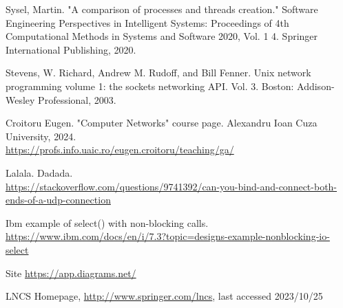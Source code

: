 \documentclass[runningheads]{llncs}
\begin{document}
\begin{thebibliography}{8}
Sysel, Martin. "A comparison of processes and threads creation." Software Engineering Perspectives in Intelligent Systems: Proceedings of 4th Computational Methods in Systems and Software 2020, Vol. 1 4. Springer International Publishing, 2020. 

 Stevens, W. Richard, Andrew M. Rudoff, and Bill Fenner. Unix network programming volume 1: the sockets networking API. Vol. 3. Boston: Addison-Wesley Professional, 2003.

  Croitoru Eugen. "Computer Networks" course page. Alexandru Ioan Cuza University, 2024. \\
  \url{https://profs.info.uaic.ro/eugen.croitoru/teaching/ga/}

    Lalala. Dadada. \\
    \url{https://stackoverflow.com/questions/9741392/can-you-bind-and-connect-both-ends-of-a-udp-connection}

 Ibm example of select() with non-blocking calls. \url{https://www.ibm.com/docs/en/i/7.3?topic=designs-example-nonblocking-io-select}

 Site \url{https://app.diagrams.net/}

LNCS Homepage, \url{http://www.springer.com/lncs}, last accessed 2023/10/25
\end{thebibliography}
\end{document}
